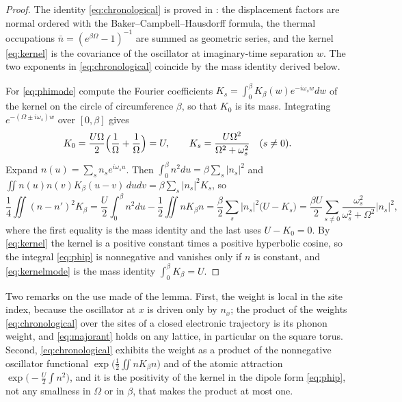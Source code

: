 \documentclass[11pt]{article}
\theoremstyle{plain}
\theoremstyle{definition}
\begin{document}
\begin{proof}
The identity \eqref{eq:chronological} is proved in \cite[Section 3]{rens2026a}: the
displacement factors are normal ordered with the Baker--Campbell--Hausdorff formula,
the thermal occupations $\bar n=(e^{\beta\Omega}-1)^{-1}$ are summed as geometric
series, and the kernel \eqref{eq:kernel} is the covariance of the oscillator at
imaginary-time separation $w$. The two exponents in \eqref{eq:chronological}
coincide by the mass identity derived below.

For \eqref{eq:phimode} compute the Fourier coefficients
$K_s=\int_0^\beta K_\beta(w)e^{-i\omega_sw}dw$ of the kernel on the circle of
circumference $\beta$, so that $K_0$ is its mass. Integrating
$e^{-(\Omega\pm i\omega_s)w}$ over $[0,\beta]$ gives
\begin{equation}\label{eq:kernelmode}
K_0=\frac{U\Omega}{2}\Bigl(\frac1\Omega+\frac1\Omega\Bigr)=U,
\qquad
K_s=\frac{U\Omega^{2}}{\Omega^{2}+\omega_s^{2}}\quad(s\ne0).
\end{equation}
Expand $n(u)=\sum_sn_se^{i\omega_su}$. Then $\int_0^\beta n^{2}du
=\beta\sum_s|n_s|^{2}$ and $\iint n(u)n(v)K_\beta(u-v)\,dudv
=\beta\sum_s|n_s|^{2}K_s$, so
\begin{equation}
\frac14\iint(n-n')^{2}K_\beta
=\frac{U}{2}\int_0^\beta n^{2}du-\frac12\iint nK_\beta n
=\frac{\beta}{2}\sum_s|n_s|^{2}\bigl(U-K_s\bigr)
=\frac{\beta U}{2}\sum_{s\ne0}\frac{\omega_s^{2}}{\omega_s^{2}+\Omega^{2}}|n_s|^{2},
\end{equation}
where the first equality is the mass identity and the last uses $U-K_0=0$. By
\eqref{eq:kernel} the kernel is a positive constant times a positive hyperbolic
cosine, so the integral \eqref{eq:phip} is nonnegative and vanishes only if $n$ is
constant, and \eqref{eq:kernelmode} is the mass identity $\int_0^\beta K_\beta=U$.
\end{proof}

Two remarks on the use made of the lemma. First, the weight is local in the site
index, because the oscillator at $x$ is driven only by $n_x$; the product of the
weights \eqref{eq:chronological} over the sites of a closed electronic trajectory is
its phonon weight, and \eqref{eq:majorant} holds on any lattice, in particular on the
square torus. Second, \eqref{eq:chronological} exhibits the weight as a product of the
nonnegative oscillator functional $\exp\bigl(\tfrac12\iint nK_\beta n\bigr)$ and of
the atomic attraction $\exp\bigl(-\tfrac U2\int n^{2}\bigr)$, and it is the positivity
of the kernel in the dipole form \eqref{eq:phip}, not any smallness in $\Omega$ or in
$\beta$, that makes the product at most one.



\end{document}
